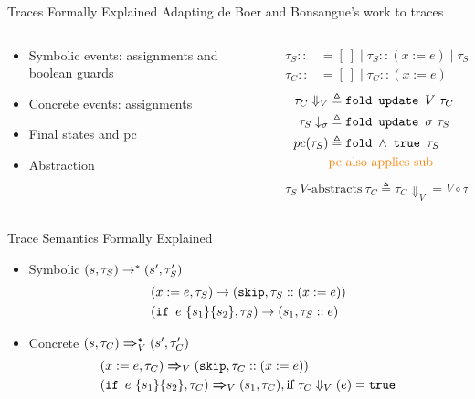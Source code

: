 \documentclass{beamer}
\renewcommand{\note}[1]{{\color{orange}#1}}
\DeclareMathOperator{\ifs}{\mathtt{if}}
\DeclareMathOperator{\skips}{\mathtt{skip}}
\DeclareMathOperator{\fold}{\mathtt{fold}}
\DeclareMathOperator{\update}{\mathtt{update}}
\DeclareMathOperator{\true}{\mathtt{true}}
\newcommand{\pc}[1]{\ensuremath{pc(#1)}}
\newcommand{\accC}[2][V_0]{\ensuremath{#2\Downarrow_{#1}}}
\newcommand{\accS}[2][]{\ensuremath{#2\downarrow_{#1}}}
\begin{document}
\begin{frame}{Traces Formally Explained}
  Adapting de Boer and Bonsangue's work to traces
  \begin{columns}
    \begin{column}{.5\textwidth}
      \begin{itemize}
        \item Symbolic events: assignments and boolean guards
        \item Concrete events: assignments
        \item Final states and pc
        \item Abstraction
      \end{itemize}
    \end{column}
    \begin{column}{.5\textwidth}
      \begin{align*}
        \tau_{S} ::&= [~] \mid \tau_{S} :: (x := e) \mid \tau_{S} :: e\\
        \tau_{C} ::&= [~] \mid \tau_{C} :: (x := e)
      \end{align*}
      \begin{align*}
        \accC[V]{\tau_{C}} &\triangleq \fold~\update~V~\tau_{C}\\
        \accS[\sigma]{\tau_{S}} &\triangleq \fold~\update~\sigma~\tau_{S}\\
        \pc{\tau_{S}} &\triangleq \fold~\land~\true~\tau_{S} \\
        &\note{\text{pc also applies sub}}
      \end{align*}
      \begin{align*}
        \tau_{S}~V\text{-abstracts}~\tau_{C} \triangleq \accC[V]{\tau_{C}} = V \circ \accS[id]{\tau_{S}}
      \end{align*}
    \end{column}
  \end{columns}
\end{frame}

\begin{frame}{Trace Semantics Formally Explained}
  \begin{itemize}
    \item Symbolic $\Sstar{(s, \tau_{S})}{(s', \tau'_{S})}$
          \begin{align*}
            &\Sstep{(x := e, \tau_{S})}{(\skips, \tau_{S} :: (x :=  e))}\\
            &\Sstep{(\ifs~e~\{s_{1}\}\{s_{2}\}, \tau_{S})}{(s_{1}, \tau_{S} :: e)}\\
          \end{align*}
    \item Concrete $\Cstar[V]{(s, \tau_{C})}{(s', \tau'_{C})}$
          \begin{align*}
            &\Cstep[V]{(x := e, \tau_{C})}{(\skips, \tau_{C} :: (x := e))}\\
            &\Cstep[V]{(\ifs~e~\{s_{1}\}\{s_{2}\}, \tau_{C})}{(s_{1}, \tau_{C})}, \text{if } \accC[V]{\tau_C} (e) = \true
          \end{align*}
  \end{itemize}
\end{frame}
\end{document}

